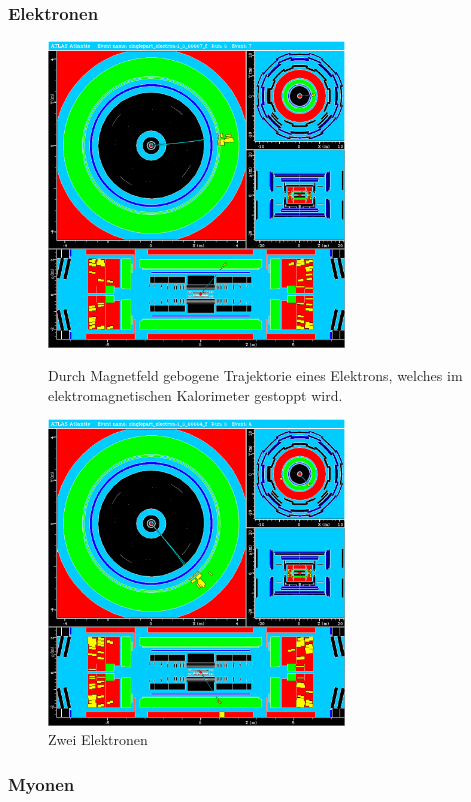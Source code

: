 \documentclass[11pt, a4paper]{article}
\numberwithin{equation}{section}
\begin{document}
\subsubsection{Elektronen}
\begin{figure}
	\centering
	\includegraphics[width=0.70\textwidth]{./data/atlantis/singlepart_events_new/electron/curvature.png}
	\caption{Durch Magnetfeld gebogene Trajektorie eines Elektrons, welches im elektromagnetischen Kalorimeter gestoppt wird.}
	\vspace{1em}
	\includegraphics[width=0.70\textwidth]{./data/atlantis/singlepart_events_new/electron/twopart.png}
	\caption{Zwei Elektronen}
\end{figure}

\subsubsection{Myonen}
\end{document}
